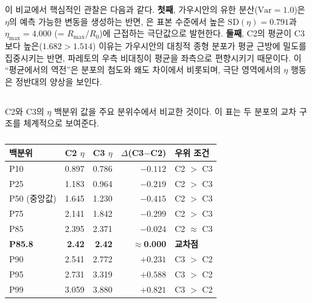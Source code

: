 이 비교에서 핵심적인 관찰은 다음과 같다.
\textbf{첫째}, 가우시안의 유한 분산($\mathrm{Var} = 1.0$)은
$\eta$의 예측 가능한 변동을 생성하는 반면,
은 표본 수준에서 높은 $\mathrm{SD}(\eta) = 0.791$과
$\eta_{\max} = 4.000$ (= $R_{\max}/R_0$)에 근접하는 극단값으로 발현한다.
\textbf{둘째}, C2의 평균이 C3보다 높은($1.682 > 1.514$) 이유는
가우시안의 대칭적 종형 분포가 평균 근방에 밀도를 집중시키는 반면,
파레토의 우측 비대칭이 평균을 좌측으로 편향시키기 때문이다.
이 ``평균에서의 역전''은 분포의 첨도와 왜도 차이에서 비롯되며,
극단 영역에서의 $\eta$ 행동은 정반대의 양상을 보인다.


\subsection{}
\label{subsec:c2c3_percentile}

 C2와 C3의 $\eta$ 백분위 값을
주요 분위수에서 비교한 것이다. 이 표는 두 분포의 교차 구조를
체계적으로 보여준다.

\begin{table}[htbp]
  \centering
  \caption{}
  \label{tab:c2_c3_percentile}
  \small
  \begin{tabular}{l rr r l}
    \toprule
    \textbf{백분위} & \textbf{C2 $\eta$} & \textbf{C3 $\eta$} &
    \textbf{$\Delta$(C3$-$C2)} & \textbf{우위 조건} \\
    \midrule
    P10 & 0.897 & 0.786 & $-0.112$ & C2 $>$ C3 \\
    P25 & 1.183 & 0.964 & $-0.219$ & C2 $>$ C3 \\
    P50 (중앙값) & 1.645 & 1.230 & $-0.415$ & C2 $>$ C3 \\
    P75 & 2.141 & 1.842 & $-0.299$ & C2 $>$ C3 \\
    P85 & 2.395 & 2.371 & $-0.024$ & C2 $\approx$ C3 \\
    \textbf{P85.8} & \textbf{2.42} & \textbf{2.42} & $\approx$\textbf{0.000} & \textbf{교차점} \\
    P90 & 2.541 & 2.772 & $+0.231$ & C3 $>$ C2 \\
    P95 & 2.731 & 3.319 & $+0.588$ & C3 $>$ C2 \\
    P99 & 3.059 & 3.880 & $+0.821$ & C3 $>$ C2 \\
    \bottomrule
  \end{tabular}
\end{table}

